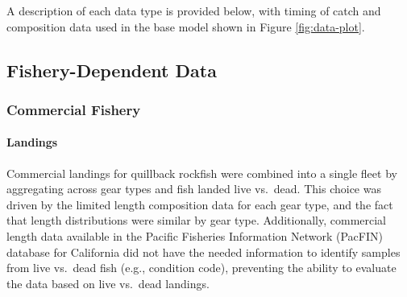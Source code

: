 \documentclass[11pt,
  english,
  a4paper,
]{article}
\begin{document}
\tagstructend


A description of each data type is provided below, with timing of catch and composition data used in the base model shown in Figure \ref{fig:data-plot}.

\leavevmode\tagmcend\tagstructend\par


\hypertarget{fishery-dependent-data}{%
\subsection{Fishery-Dependent Data}\label{fishery-dependent-data}}

\leavevmode\tagmcend\tagstructend


\hypertarget{commercial-fishery}{%
\subsubsection{Commercial Fishery}\label{commercial-fishery}}

\leavevmode\tagmcend\tagstructend


\hypertarget{landings}{%
\paragraph{Landings}\label{landings}}

\leavevmode\tagmcend\tagstructend


Commercial landings for quillback rockfish were combined into a single fleet by aggregating across gear types and fish landed live vs.~dead. This choice was driven by the limited length composition data for each gear type, and the fact that length distributions were similar by gear type. Additionally, commercial length data available in the Pacific Fisheries Information Network (PacFIN) database for California did not have the needed information to identify samples from live vs.~dead fish (e.g., condition code), preventing the ability to evaluate the data based on live vs.~dead landings.

\leavevmode\tagmcend\tagstructend\par
\end{document}
